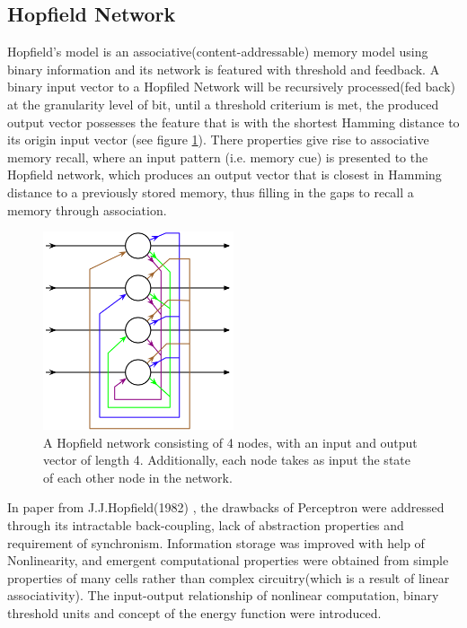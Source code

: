 \subsection{Hopfield Network}

Hopfield's model is an associative(content-addressable) memory model using binary information and its network is featured with threshold and feedback. A binary input vector to a Hopfiled Network will be recursively processed(fed back) at the granularity level of bit, until a threshold criterium is met, the produced output vector possesses the feature that is with the shortest Hamming distance to its origin input vector (see figure \ref{fig:hopfield_network}). There properties give rise to associative memory recall, where an input pattern (i.e. memory cue) is presented to the Hopfield network, which produces an output vector that is closest in Hamming distance to a previously stored memory, thus filling in the gaps to recall a memory through association.

\begin{figure}[htbp]
	\begin{center}
		\includegraphics[width=0.5\textwidth]{inc/hopfield_network.png}
		\caption{A Hopfield network consisting of 4 nodes, with an input and output vector of length 4. Additionally, each node takes as input the state of each other node in the network.\protect\footnotemark}
		\label{fig:hopfield_network}
	\end{center}
\end{figure}

In paper from J.J.Hopfield(1982) \cite{computational_abilities}, the drawbacks of Perceptron were addressed through its intractable back-coupling, lack of abstraction properties and requirement of synchronism. Information storage was improved with help of Nonlinearity, and emergent computational properties were obtained from simple properties of many cells rather than complex circuitry(which is a result of linear associativity). The input-output relationship of nonlinear computation, binary threshold units and concept of the energy function were introduced.


